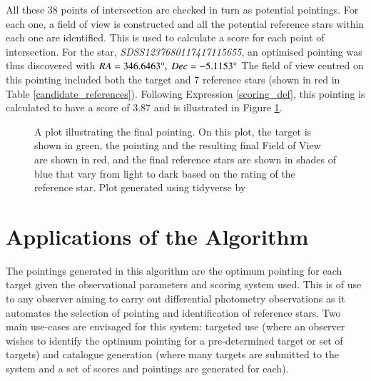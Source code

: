 \documentclass[referee]{aa}
\begin{document}
All these 38 points of intersection are checked in turn as potential pointings. For each one, a field of view is constructed and all the potential reference stars within each one are identified. This is used to calculate a score for each point of intersection. For the star, \textit{SDSS1237680117417115655}, an optimised pointing was thus discovered with ${RA = 346.6463\degree},\ {Dec = -5.1153\degree}$ The field of view centred on this pointing included both the target and 7 reference stars (shown in red in Table \ref{candidate_references}). Following Expression \ref{scoring_def}, this pointing is calculated to have a score of 3.87 and is illustrated in Figure \ref{locus_plot}.

\begin{figure}[!htb]
\caption{\label{locus_plot}A plot illustrating the final pointing.  On this plot, the target is shown in green, the pointing and the resulting final Field of View are shown in red, and the final reference stars are shown in shades of blue that vary from light to dark based on the rating of the reference star. Plot generated using tidyverse by \citet{tidyverse}}
\end{figure}


\section{Applications of the Algorithm}
\label{Applications}
The pointings generated in this algorithm are the optimum pointing for each target given the observational parameters and scoring system used. This is of use to any observer aiming to carry out differential photometry observations as it automates the selection of pointing and identification of reference stars. Two main use-cases are envisaged for this system: targeted use (where an observer wishes to identify the optimum pointing for a pre-determined target or set of targets) and catalogue generation (where many targets are submitted to the system and a set of scores and pointings are generated for each). 
\end{document}
